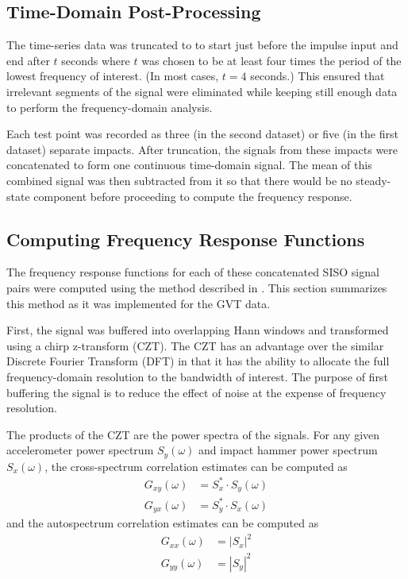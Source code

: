 \subsection{Time-Domain Post-Processing}

The time-series data was truncated to to start just before the impulse input and end after $t$ seconds where $t$ was chosen to be at least four times the period of the lowest frequency of interest. (In most cases, $t=4$ seconds.) This ensured that irrelevant segments of the signal were eliminated while keeping still enough data to perform the frequency-domain analysis.

Each test point was recorded as three (in the second dataset) or five (in the first dataset) separate impacts. After truncation, the signals from these impacts were concatenated to form one continuous time-domain signal. The mean of this combined signal was then subtracted from it so that there would be no steady-state component before proceeding to compute the frequency response.

\subsection{Computing Frequency Response Functions}

The frequency response functions for each of these concatenated SISO signal pairs were computed using the method described in \cite{Tischler2012}. This section summarizes this method as it was implemented for the GVT data.

First, the signal was buffered into overlapping Hann windows and transformed using a chirp z-transform (CZT). The CZT has an advantage over the similar Discrete Fourier Transform (DFT) in that it has the ability to allocate the full frequency-domain resolution to the bandwidth of interest. The purpose of first buffering the signal is to reduce the effect of noise at the expense of frequency resolution.

The products of the CZT are the power spectra of the signals. For any given accelerometer power spectrum $S_y(\omega)$ and impact hammer power spectrum $S_x(\omega)$, the cross-spectrum correlation estimates can be computed as
\begin{align}
    G_{xy}(\omega) &= S_x^* \cdot S_y(\omega) \\
    G_{yx}(\omega) &= S_y^* \cdot S_x(\omega)
\end{align}
and the autospectrum correlation estimates can be computed as
\begin{align}
    G_{xx}(\omega) &= |S_x|^2	 \\
    G_{yy}(\omega) &= |S_y|^2
\end{align}

